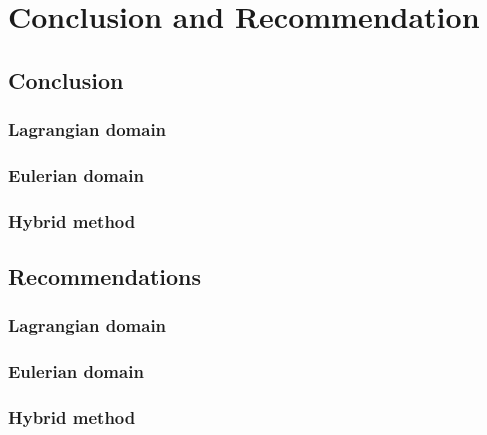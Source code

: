 \chapter{Conclusion and Recommendation}
\label{ch:ConclusionandRecommendation}

\section{Conclusion}

\subsection{Lagrangian domain}

\subsection{Eulerian domain}

\subsection{Hybrid method}


\section{Recommendations}

\subsection{Lagrangian domain}

\subsection{Eulerian domain}

\subsection{Hybrid method}

%
